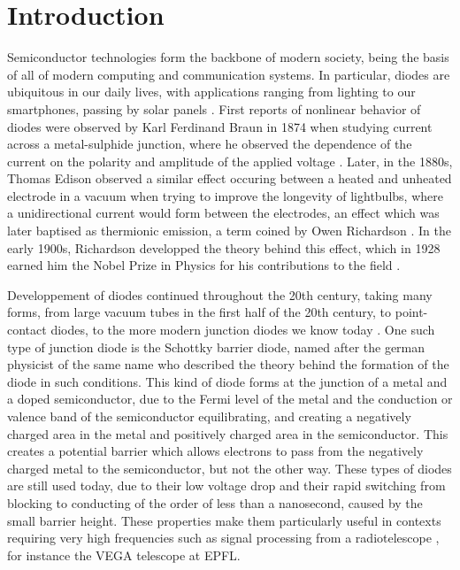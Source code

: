 \section{Introduction}
Semiconductor technologies form the backbone of modern society, being the basis of all of modern computing and communication systems.
In particular, diodes are ubiquitous in our daily lives, with applications ranging from lighting to our smartphones, passing by solar panels \cite{notice}. 
First reports of nonlinear behavior of diodes were observed by Karl Ferdinand Braun in 1874 when studying current across a metal-sulphide junction, where he observed the dependence of the current on the polarity and amplitude of the applied voltage \cite{braun_ueber_1875}.
Later, in the 1880s, Thomas Edison observed a similar effect occuring between a heated and unheated electrode in a vacuum when trying to improve the longevity of lightbulbs, where a unidirectional current would form between the electrodes, an effect which was later baptised as thermionic emission, a term coined by Owen Richardson \cite{da_rosa_chapter_2022}.
In the early 1900s, Richardson developped the theory behind this effect, which in 1928 earned him the Nobel Prize in Physics for his contributions to the field \cite{da_rosa_chapter_2022}.

Developpement of diodes continued throughout the 20th century, taking many forms, from large vacuum tubes in the first half of the 20th century, to point-contact diodes, to the more modern junction diodes we know today \cite{bernardo_revision_2024}.
One such type of junction diode is the Schottky barrier diode, named after the german physicist of the same name who described the theory behind the formation of the diode in such conditions.
This kind of diode forms at the junction of a metal and a doped semiconductor, due to the Fermi level of the metal and the conduction or valence band of the semiconductor equilibrating, and creating a negatively charged area in the metal and positively charged area in the semiconductor.
This creates a potential barrier which allows electrons to pass from the negatively charged metal to the semiconductor, but not the other way.
These types of diodes are still used today, due to their low voltage drop and their rapid switching from blocking to conducting of the order of less than a nanosecond, caused by the small barrier height. These properties make them particularly useful in contexts requiring very high frequencies such as signal processing from a radiotelescope \cite{kent_walters_introduction_1997}, for instance the VEGA telescope at EPFL.

